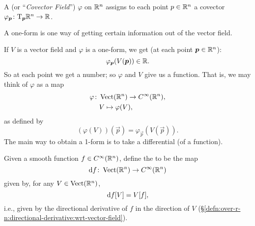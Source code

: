 \begin{definition}
A  (or ``\emph{Covector Field}'') $\varphi$ on
$\mathbb{R}^{n}$ assigns to each point $p\in\mathbb{R}^{n}$ a covector $\varphi_{\boldsymbol{p}}\colon\mathrm{T}_{\boldsymbol{p}}\mathbb{R}^{n}\to\mathbb{R}$.
\end{definition}

\begin{remark}
A one-form is one way of getting certain information out of the vector
field.

If $V$ is a vector field and $\varphi$ is a one-form, we get (at each
point $\boldsymbol{p}\in\mathbb{R}^{n}$):
\begin{equation}
\varphi_{\boldsymbol{p}}(V(\boldsymbol{p}))\in\mathbb{R}.
\end{equation}
So at each point we get a number; so $\varphi$ and $V$ give us a
function. That is, we may think of $\varphi$ as a map
\begin{equation}
\begin{split}
  \varphi\colon &\operatorname{Vect}(\mathbb{R}^{n})\to C^{\infty}(\mathbb{R}^{n}),\\
  &V\mapsto\varphi(V),
\end{split}
\end{equation}
as defined by
\begin{equation}
\left(\varphi(V)\right)(\vec{p}) = \varphi_{\vec{p}}(V(\vec{p})).
\end{equation}
The main way to obtain a 1-form is to take a differential (of a function).
\end{remark}

\begin{definition}
Given a smooth function $f\in C^{\infty}(\mathbb{R}^{n})$, define the
 to be the map
\begin{equation}
\mathrm{d} f\colon\operatorname{Vect}(\mathbb{R}^{n})\to C^{\infty}(\mathbb{R}^{n})
\end{equation}
given by, for any $V\in\operatorname{Vect}(\mathbb{R}^{n})$,
\begin{equation}
\mathrm{d} f[V] = V[f],
\end{equation}
i.e., given by the directional derivative of $f$ in the direction of $V$
(\S\ref{defn:over-r-n:directional-derivative:wrt-vector-field}).
\end{definition}


